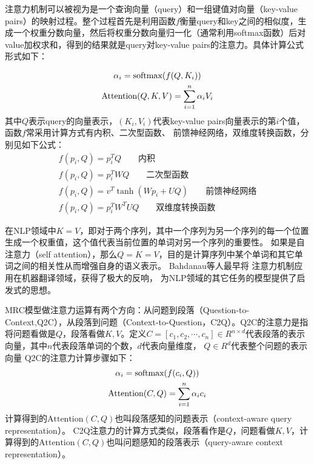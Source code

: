 注意力机制可以被视为是一个查询向量（query）和一组键值对向量（key-value pairs）的映射过程。整个过程首先是利用函数$f$衡量query和key之间的相似度，生成一个权重分数向量，然后将权重分数向量归一化（通常利用softmax函数）后对value加权求和，得到的结果就是query对key-value pairs的注意力。具体计算公式形式如下：

\begin{gather}
\alpha_i=\text{softmax}(f(Q,K_i)) \notag \\
\text{Attention}(Q,K,V)=\sum_{i=1}^{n}\alpha_iV_i
\end{gather}
其中$Q$表示query的向量表示，$(K_i,V_i)$代表key-value pairs向量表示的第$i$个值，
函数$f$常采用计算方式有内积、二次型函数、
前馈神经网络，双维度转换函数，分别见如下公式：
\begin{gather}
f(p_i,Q)=p_i^TQ \qquad \text{内积} \\
f(p_i,Q)=p_i^TWQ\qquad \text{二次型函数}\\
f(p_i,Q)=v^T\tanh(Wp_i+UQ)\qquad \text{前馈神经网络} \\
f(p_i,Q)=p_i^TW^TUQ \qquad \text{双维度转换函数}
\end{gather}

在NLP领域中$K=V$，即对于两个序列，其中一个序列为另一个序列的每一个位置生成一个权重值，这个值代表当前位置的单词对另一个序列的重要性。
如果是自注意力（self attention），那么$Q=K=V$，目的是计算序列中某个单词和其它单词之间的相关性从而增强自身的语义表示。
Bahdanau等人最早将
注意力机制应用在机器翻译领域，获得了极大的反响，
为NLP领域的其它任务的模型提供了启发式的思想。

MRC模型做注意力运算有两个方向：从问题到段落（Question-to-Context,Q2C），从段落到问题（Context-to-Question，C2Q）。Q2C的注意力是指
将问题看做是$Q$，段落看做$K,V$。定义$C=[c_1,c_2,\cdots,c_n] \in R^{n\times d}$代表段落的表示向量，其中$n$代表段落单词的个数，$d$代表向量维度，
$Q\in R^{d}$代表整个问题的表示向量
Q2C的注意力计算步骤如下：
\begin{gather}
\alpha_i=\text{softmax}(f(c_i,Q)) \notag \\
\text{Attention}(C,Q)=\sum_{i=1}^{n}\alpha_{i}c_i
\end{gather}
计算得到的$\text{Attention}(C,Q)$也叫段落感知的问题表示（context-aware query representation）。
C2Q注意力的计算方式类似，段落看作是$Q$，问题看做$K,V$，计算得到的$\text{Attention}(C,Q)$也叫问题感知的段落表示（query-aware context representation）。

